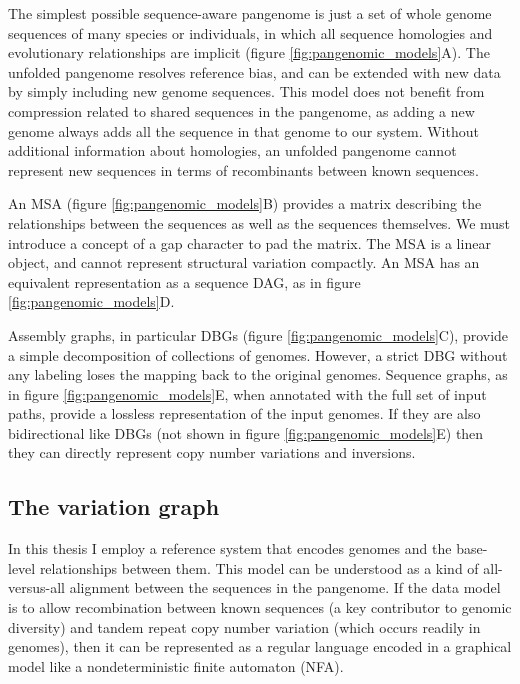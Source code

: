 The simplest possible sequence-aware pangenome is just a set of whole genome sequences of many species or individuals, in which all sequence homologies and evolutionary relationships are implicit (figure \ref{fig:pangenomic_models}A).
The unfolded pangenome resolves reference bias, and can be extended with new data by simply including new genome sequences.
This model does not benefit from compression related to shared sequences in the pangenome, as adding a new genome always adds all the sequence in that genome to our system.
Without additional information about homologies, an unfolded pangenome cannot represent new sequences in terms of recombinants between known sequences.

An MSA (figure \ref{fig:pangenomic_models}B) provides a matrix describing the relationships between the sequences as well as the sequences themselves.
We must introduce a concept of a gap character to pad the matrix.
The MSA is a linear object, and cannot represent structural variation compactly.
An MSA has an equivalent representation as a sequence DAG, as in figure \ref{fig:pangenomic_models}D.

Assembly graphs, in particular DBGs (figure \ref{fig:pangenomic_models}C), provide a simple decomposition of collections of genomes.
However, a strict DBG without any labeling loses the mapping back to the original genomes.
Sequence graphs, as in figure \ref{fig:pangenomic_models}E, when annotated with the full set of input paths, provide a lossless representation of the input genomes.
If they are also bidirectional like DBGs (not shown in figure \ref{fig:pangenomic_models}E) then they can directly represent copy number variations and inversions.

\subsection{The variation graph}
\label{sec:the_variation_graph}

In this thesis I employ a reference system that encodes genomes and the base-level relationships between them.
This model can be understood as a kind of all-versus-all alignment between the sequences in the pangenome.
If the data model is to allow recombination between known sequences (a key contributor to genomic diversity) and tandem repeat copy number variation (which occurs readily in genomes), then it can be represented as a regular language encoded in a graphical model like a nondeterministic finite automaton (NFA).

